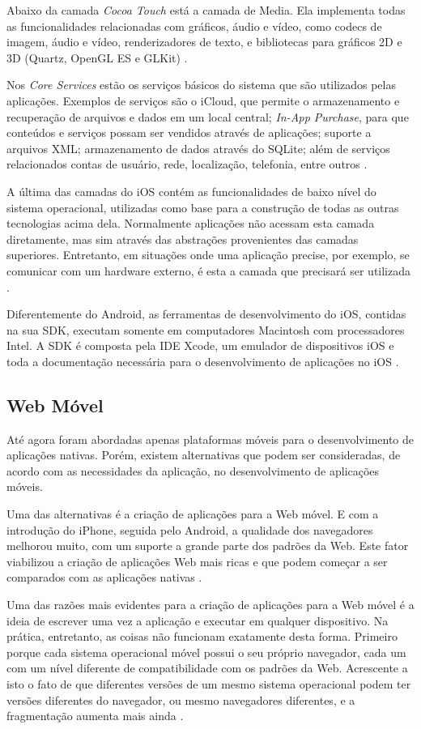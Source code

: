 \documentclass[diss]{template/setrem}
\begin{document}
Abaixo da camada \emph{Cocoa Touch} está a camada de Media. Ela implementa todas as funcionalidades relacionadas com gráficos, áudio e vídeo, como codecs de imagem, áudio e vídeo, renderizadores de texto, e bibliotecas para gráficos 2D e 3D (Quartz, OpenGL ES e GLKit) \citep{Apple2011}.

Nos \emph{Core Services} estão os serviços básicos do sistema que são utilizados pelas aplicações. Exemplos de serviços são o iCloud, que permite o armazenamento e recuperação de arquivos e dados em um local central; \emph{In-App Purchase}, para que conteúdos e serviços possam ser vendidos através de aplicações; suporte a arquivos XML; armazenamento de dados através do SQLite; além de serviços relacionados contas de usuário, rede, localização, telefonia, entre outros \citep{Apple2011}.

A última das camadas do iOS contém as funcionalidades de baixo nível do sistema operacional, utilizadas como base para a construção de todas as outras tecnologias acima dela. Normalmente aplicações não acessam esta camada diretamente, mas sim através das abstrações provenientes das camadas superiores. Entretanto, em situações onde uma aplicação precise, por exemplo, se comunicar com um hardware externo, é esta a camada que precisará ser utilizada \citep{Apple2011}.

Diferentemente do Android, as ferramentas de desenvolvimento do iOS, contidas na sua SDK, executam somente em computadores Macintosh com processadores Intel. A SDK é composta pela IDE Xcode, um emulador de dispositivos iOS e toda a documentação necessária para o desenvolvimento de aplicações no iOS \citep{Apple2011}.

\subsection{Web Móvel}
Até agora foram abordadas apenas plataformas móveis para o desenvolvimento de aplicações nativas. Porém, existem alternativas que podem ser consideradas, de acordo com as necessidades da aplicação, no desenvolvimento de aplicações móveis.

Uma das alternativas é a criação de aplicações para a Web móvel. E com a introdução do iPhone, seguida pelo Android, a qualidade dos navegadores melhorou muito, com um suporte a grande parte dos padrões da Web. Este fator viabilizou a criação de aplicações Web mais ricas e que podem começar a ser comparados com as aplicações nativas \citep{Fling2009}.

Uma das razões mais evidentes para a criação de aplicações para a Web móvel é a ideia de escrever uma vez a aplicação e executar em qualquer dispositivo. Na prática, entretanto, as coisas não funcionam exatamente desta forma. Primeiro porque cada sistema operacional móvel possui o seu próprio navegador, cada um com um nível diferente de compatibilidade com os padrões da Web. Acrescente a isto o fato de que diferentes versões de um mesmo sistema operacional podem ter versões diferentes do navegador, ou mesmo navegadores diferentes, e a fragmentação aumenta mais ainda \citep{Fling2009}.
\end{document}
